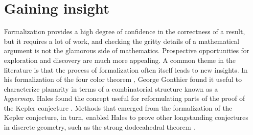 \documentclass{amsart}
\theoremstyle{definition}
\theoremstyle{remark}
\numberwithin{equation}{section}
\begin{document}
\section{Gaining insight}

Formalization provides a high degree of confidence in the correctness of a result, but it requires a lot of work, and checking the gritty details of a mathematical argument is not the glamorous side of mathematics. Prospective opportunities for exploration and discovery are much more appealing. A common theme in the literature is that the process of formalization often itself leads to new insights. In his formalization of the four color theorem \cite{gonthier:08}, George Gonthier found it useful to characterize planarity in terms of a combinatorial structure known as a \emph{hypermap}. Hales found the concept useful for reformulating parts of the proof of the Kepler conjecture \cite[Chapter 4]{hales:12}. Methods that emerged from the formalization of the Kepler conjecture, in turn, enabled Hales to prove other longstanding conjectures in discrete geometry, such as the strong dodecahedral theorem \cite[Section 8.6]{hales:12}.
\end{document}
